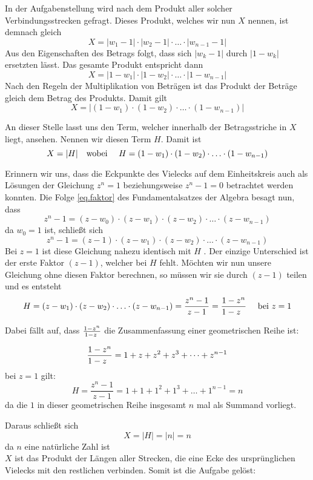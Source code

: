 \documentclass[a4paper,12pt]{article} %
\begin{document}
In der Aufgabenstellung wird nach dem Produkt aller solcher Verbindungsstrecken gefragt.
Dieses Produkt, welches wir nun $X$ nennen, ist demnach gleich
\[X = |w_1-1|\cdot|w_2-1|\cdot\ldots\cdot|w_{n-1}-1|\]
Aus den Eigenschaften des Betrags folgt, dass sich $|w_k-1|$ durch $|1-w_k|$ ersetzten lässt.
Das gesamte Produkt entspricht dann
\[X=|1-w_1|\cdot|1-w_2|\cdot\ldots\cdot|1-w_{n-1}|\]
Nach den Regeln der Multiplikation von Beträgen ist das Produkt der Beträge gleich dem Betrag des Produkts. Damit gilt
\begin{equation}\label{X}
	X=|(1-w_1)\cdot(1-w_2)\cdot\ldots\cdot(1-w_{n-1})|
\end{equation}

An dieser Stelle lasst uns den Term, welcher innerhalb der Betragsstriche in $X$ liegt, ansehen.
Nennen wir diesen Term $H$. Damit ist
\begin{equation}
	X=|H| \textrm{\quad wobei \quad}	H=(1-w_1)\cdot(1-w_2)\cdot\ldots\cdot(1-w_{n-1})
\end{equation}

Erinnern wir uns, dass die Eckpunkte des Vielecks auf dem Einheitskreis auch als Lösungen der Gleichung $z^n=1$ beziehungsweise $z^n-1=0$ betrachtet werden konnten. Die Folge \eqref{eq.faktor} des Fundamentalsatzes der Algebra besagt nun, dass 
\[z^n-1=(z-w_0)\cdot(z-w_1)\cdot(z-w_2)\cdot\ldots\cdot(z-w_{n-1})\]
da $w_0=1$ ist, schließt sich
\[z^n-1=(z-1)\cdot(z-w_1)\cdot(z-w_2)\cdot\ldots\cdot(z-w_{n-1})\]
Bei $z=1$ ist diese Gleichung nahezu identisch mit $H$ .
Der einzige Unterschied ist der erste Faktor $(z-1)$, welcher bei $H$ fehlt.
Möchten wir nun unsere Gleichung ohne diesen Faktor berechnen, so müssen wir sie durch $(z-1)$ teilen und es entsteht
\begin{equation}
	H=(z-w_1)\cdot(z-w_2)\cdot\ldots\cdot(z-w_{n-1})=\frac{z^n-1}{z-1}=\frac{1-z^n}{1-z\hspace{2mm}} \quad \textrm{ bei } z=1
\end{equation}


Dabei fällt auf, dass $\frac{1-z^n}{1-z\hspace{1mm}}$ die Zusammenfassung einer geometrischen Reihe ist:




\[\frac{1-z^n}{1-z\hspace{2mm}}=1+z+z^2+z^3+\dots+z^{n-1}\]
bei $z=1$ gilt:
\[H=\frac{z^n-1}{z-1}=1+1+1^2+1^3+\dots+1^{n-1}=n\]
da die $1$ in dieser geometrischen Reihe insgesamt $n$ mal als Summand vorliegt.


Daraus schließt sich
\[X=|H|=|n|=n\]
da $n$ eine natürliche Zahl ist\\

$X$ ist das Produkt der Längen aller Strecken, die eine Ecke des ursprünglichen Vielecks mit den restlichen verbinden. Somit ist die Aufgabe gelöst:\\
\end{document}
